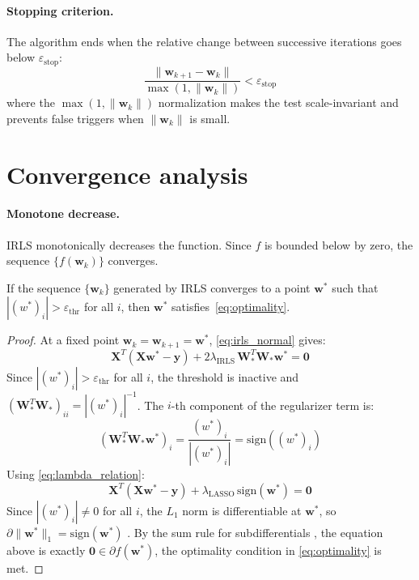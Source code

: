 \paragraph{Stopping criterion.} The algorithm ends when the relative change between successive iterations goes below $\varepsilon_{\mathrm{stop}}$:
$$\frac{\|\mathbf{w}_{k+1} - \mathbf{w}_k\|}{\max(1, \|\mathbf{w}_k\|)} < \varepsilon_{\mathrm{stop}}$$
where the $\max(1, \|\mathbf{w}_k\|)$ normalization makes the test scale-invariant and prevents false triggers when $\|\mathbf{w}_k\|$ is small.

\section{Convergence analysis}
\label{sec:irls_convergence}

\paragraph{Monotone decrease.}
IRLS monotonically decreases the function. Since $f$ is bounded below by zero, the sequence $\{f(\mathbf{w}_k)\}$ converges.

\begin{theorem}
    \label{thm:irls_convergence}
    If the sequence $\{\mathbf{w}_k\}$ generated by IRLS converges to a point
    $\mathbf{w}^*$ such that $|(w^*)_i| > \varepsilon_{\mathrm{thr}}$ for all $i$,
    then $\mathbf{w}^*$ satisfies~\eqref{eq:optimality}.
\end{theorem}

\begin{proof}
At a fixed point $\mathbf{w}_k = \mathbf{w}_{k+1} = \mathbf{w}^*$, \eqref{eq:irls_normal} gives:
\[
    \mathbf{X}^T(\mathbf{X}\mathbf{w}^* - \mathbf{y})
    + 2\lambda_{\text{IRLS}}\,\mathbf{W}_*^T\mathbf{W}_*\mathbf{w}^* = \mathbf{0}
\]
Since $|(w^*)_i| > \varepsilon_{\text{thr}}$ for all $i$, the threshold is inactive and
$(\mathbf{W}_*^T\mathbf{W}_*)_{ii} = |(w^*)_i|^{-1}$.
The $i$-th component of the regularizer term is:
\[
    (\mathbf{W}_*^T\mathbf{W}_*\mathbf{w}^*)_i
    = \frac{(w^*)_i}{|(w^*)_i|}
    = \mathrm{sign}((w^*)_i)
\]
Using \eqref{eq:lambda_relation}:
\[
    \mathbf{X}^T(\mathbf{X}\mathbf{w}^* - \mathbf{y})
    + \lambda_{\text{LASSO}}\,\mathrm{sign}(\mathbf{w}^*) = \mathbf{0}
\]
Since $|(w^*)_i| \neq 0$ for all $i$, the $L_1$ norm is differentiable at
$\mathbf{w}^*$, so $\partial\|\mathbf{w}^*\|_1 = \mathrm{sign}(\mathbf{w}^*)$
\cite{frangioni-slides-nonsmooth}. By the sum rule for subdifferentials
\cite{frangioni-slides-unconstrained}, the equation above is exactly
$\mathbf{0} \in \partial f(\mathbf{w}^*)$, the optimality condition
in \eqref{eq:optimality} is met.
\end{proof}


